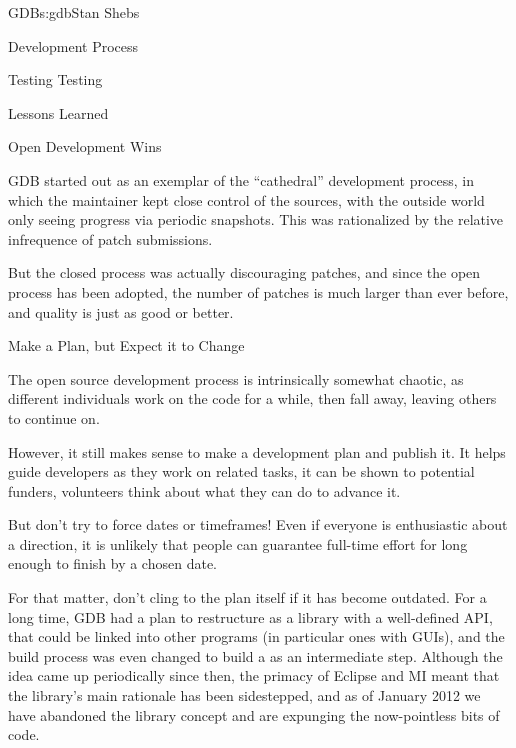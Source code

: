 \begin{aosachapter}{GDB}{s:gdb}{Stan Shebs}
\begin{aosasect1}{Development Process}
\begin{aosasect2}{Testing Testing}
\end{aosasect2}

\end{aosasect1}

\begin{aosasect1}{Lessons Learned}

\begin{aosasect2}{Open Development Wins}

GDB started out as an exemplar of the ``cathedral'' development
process, in which the maintainer kept close control of the sources,
with the outside world only seeing progress via periodic snapshots.
This was rationalized by the relative infrequence of patch submissions.

But the closed process was actually discouraging patches, and since
the open process has been adopted, the number of patches is much
larger than ever before, and quality is just as good or better.

\end{aosasect2}

\begin{aosasect2}{Make a Plan, but Expect it to Change}

The open source development process is intrinsically somewhat chaotic,
as different individuals work on the code for a while, then fall away,
leaving others to continue on.

However, it still makes sense to make a development plan and publish
it.  It helps guide developers as they work on related tasks, it can
be shown to potential funders, volunteers think about what they can do
to advance it.

But don't try to force dates or timeframes!  Even if everyone is
enthusiastic about a direction, it is unlikely that people can
guarantee full-time effort for long enough to finish by a chosen date.

For that matter, don't cling to the plan itself if it has become
outdated.  For a long time, GDB had a plan to restructure as a library
 with a well-defined API, that could be linked into other
programs (in particular ones with GUIs), and the build process was
even changed to build a  as an intermediate step.
Although the idea came up periodically since then, the primacy of
Eclipse and MI meant that the library's main rationale has been
sidestepped, and as of January 2012 we have abandoned the library
concept and are expunging the now-pointless bits of code.

\end{aosasect2}


\end{aosasect1}
\end{aosachapter}
